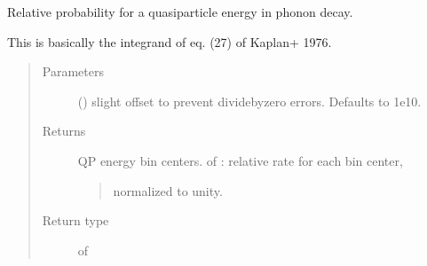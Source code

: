 \documentclass[letterpaper,10pt,english]{sphinxmanual}
\begin{document}
\begin{fulllineitems}
\begin{fulllineitems}
\begin{quote}
\begin{description}
\end{description}\end{quote}

\end{fulllineitems}


\begin{fulllineitems}
\label{\detokenize{code_structure:scdc.interaction.PhononDecayToQuasiparticles.qp_energy_distribution}}
Relative probability for a quasiparticle energy in phonon decay.

This is basically the integrand of eq. (27) of Kaplan+ 1976.
\begin{quote}\begin{description}
\item[{Parameters}] \leavevmode
{} (\sphinxstyleliteralemphasis{\sphinxupquote{, }}) \textendash{} slight offset to prevent divide\sphinxhyphen{}by\sphinxhyphen{}zero
errors. Defaults to 1e\sphinxhyphen{}10.

\item[{Returns}] \leavevmode

QP energy bin centers.
 of : relative rate for each bin center,
\begin{quote}

normalized to unity.
\end{quote}


\item[{Return type}] \leavevmode
{} of 

\end{description}\end{quote}

\end{fulllineitems}


\end{fulllineitems}

\end{document}

